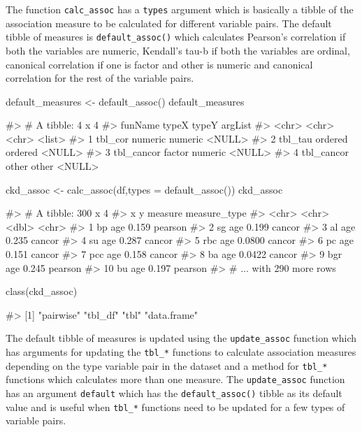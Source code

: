 The function \texttt{calc\_assoc} has a \texttt{types} argument which is
basically a tibble of the association measure to be calculated for
different variable pairs. The default tibble of measures is
\texttt{default\_assoc()} which calculates Pearson's correlation if both
the variables are numeric, Kendall's tau-b if both the variables are
ordinal, canonical correlation if one is factor and other is numeric and
canonical correlation for the rest of the variable pairs.

\begin{Schunk}
\begin{Sinput}
default_measures <- default_assoc()
default_measures
\end{Sinput}
\begin{Soutput}
#> # A tibble: 4 x 4
#>   funName    typeX   typeY   argList
#>   <chr>      <chr>   <chr>   <list> 
#> 1 tbl_cor    numeric numeric <NULL> 
#> 2 tbl_tau    ordered ordered <NULL> 
#> 3 tbl_cancor factor  numeric <NULL> 
#> 4 tbl_cancor other   other   <NULL>
\end{Soutput}
\begin{Sinput}
ckd_assoc <- calc_assoc(df,types = default_assoc())
ckd_assoc
\end{Sinput}
\begin{Soutput}
#> # A tibble: 300 x 4
#>    x     y     measure measure_type
#>    <chr> <chr>   <dbl> <chr>       
#>  1 bp    age    0.159  pearson     
#>  2 sg    age    0.199  cancor      
#>  3 al    age    0.235  cancor      
#>  4 su    age    0.287  cancor      
#>  5 rbc   age    0.0800 cancor      
#>  6 pc    age    0.151  cancor      
#>  7 pcc   age    0.158  cancor      
#>  8 ba    age    0.0422 cancor      
#>  9 bgr   age    0.245  pearson     
#> 10 bu    age    0.197  pearson     
#> # ... with 290 more rows
\end{Soutput}
\begin{Sinput}
class(ckd_assoc)
\end{Sinput}
\begin{Soutput}
#> [1] "pairwise"   "tbl_df"     "tbl"        "data.frame"
\end{Soutput}
\end{Schunk}

The default tibble of measures is updated using the
\texttt{update\_assoc} function which has arguments for updating the
\texttt{tbl\_*} functions to calculate association measures depending on
the type variable pair in the dataset and a method for \texttt{tbl\_*}
functions which calculates more than one measure. The
\texttt{update\_assoc} function has an argument \texttt{default} which
has the \texttt{default\_assoc()} tibble as its default value and is
useful when \texttt{tbl\_*} functions need to be updated for a few types
of variable pairs.


